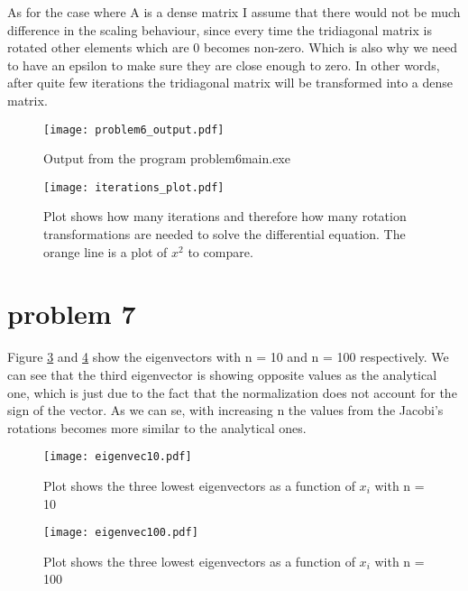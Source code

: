 \documentclass[english,notitlepage]{revtex4-1}
\begin{document}
	As for the case where A is a dense matrix I assume that there would not be much difference in the scaling behaviour, since every time the tridiagonal matrix is rotated other elements which are 0 becomes non-zero. Which is also why we need to have an epsilon to make sure they are close enough to zero. In other words, after quite few iterations the tridiagonal matrix will be transformed into a dense matrix.

	\begin{figure}[H]
		\centering 
		\texttt{[image: problem6\_output.pdf]}
		\caption{Output from the program problem6\textunderscore main.exe}
		\label{fig:problem6.pdf}
	\end{figure}

	\begin{figure}[H]
		\centering 
		\texttt{[image: iterations\_plot.pdf]}
		\caption{Plot shows how many iterations and therefore how many rotation transformations are needed to solve the differential equation. The orange line is a plot of $x^2$ to compare.}
		\label{fig:iteration}
	\end{figure}

	\section*{problem 7}
	
	Figure \ref{fig:eigenvec10} and \ref{fig:eigenvec100} show the eigenvectors with n = 10 and n = 100 respectively. We can see that the third eigenvector is showing opposite values as the analytical one, which is just due to the fact that the normalization does not account for the sign of the vector. As we can se, with increasing n the values from the Jacobi's rotations becomes more similar to the analytical ones. 
	
	\begin{figure}[H]
		\centering 
		\texttt{[image: eigenvec10.pdf]}
		\caption{Plot shows the three lowest eigenvectors as a function of $x_i$ with n = 10}
		\label{fig:eigenvec10}
	\end{figure}

	\begin{figure}[H]
		\centering 
		\texttt{[image: eigenvec100.pdf]}
		\caption{Plot shows the three lowest eigenvectors as a function of $x_i$ with n = 100}
		\label{fig:eigenvec100}
	\end{figure}
	
	
	
	
	
	
	
	
	
	
	
\end{document}
